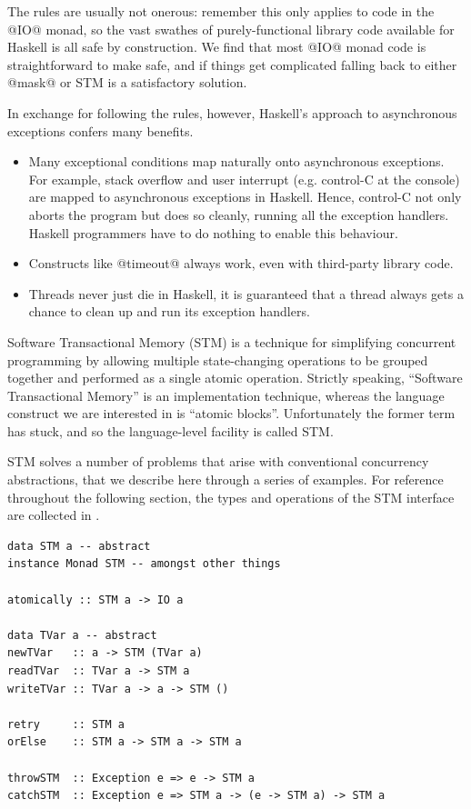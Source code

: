 The rules are usually not onerous: remember this only applies to code
in the @IO@ monad, so the vast swathes of purely-functional library
code available for Haskell is all safe by construction.  We find that
most @IO@ monad code is straightforward to make safe, and if things
get complicated falling back to either @mask@ or STM is a satisfactory
solution.

In exchange for following the rules, however, Haskell's approach to
asynchronous exceptions confers many benefits.

\begin{itemize}
\item Many exceptional conditions map naturally onto asynchronous
  exceptions.  For example, stack overflow and user interrupt
  (e.g. control-C at the console) are mapped to asynchronous
  exceptions in Haskell.  Hence, control-C not only aborts the program
  but does so cleanly, running all the exception handlers.  Haskell
  programmers have to do nothing to enable this behaviour.

\item Constructs like @timeout@ always work, even with third-party
  library code.

\item Threads never just die in Haskell, it is guaranteed that a
  thread always gets a chance to clean up and run its exception
  handlers.
\end{itemize}


Software Transactional Memory (STM) is a technique for simplifying
concurrent programming by allowing multiple state-changing operations
to be grouped together and performed as a single atomic operation.
Strictly speaking, ``Software Transactional Memory'' is an
implementation technique, whereas the language construct we are
interested in is ``atomic blocks''.  Unfortunately the former term has
stuck, and so the language-level facility is called STM.

STM solves a number of problems that arise with conventional
concurrency abstractions, that we describe here through a series of
examples.  For reference throughout the following section, the types
and operations of the STM interface are collected in
.

\begin{lstlisting}[float,label=lst:stm,caption=the interface
    provided by \texttt{Control.Concurrent.STM},language=HaskellUlisses,style=numbers]
data STM a -- abstract
instance Monad STM -- amongst other things

atomically :: STM a -> IO a

data TVar a -- abstract
newTVar   :: a -> STM (TVar a)
readTVar  :: TVar a -> STM a
writeTVar :: TVar a -> a -> STM ()

retry     :: STM a
orElse    :: STM a -> STM a -> STM a

throwSTM  :: Exception e => e -> STM a
catchSTM  :: Exception e => STM a -> (e -> STM a) -> STM a
\end{lstlisting}


